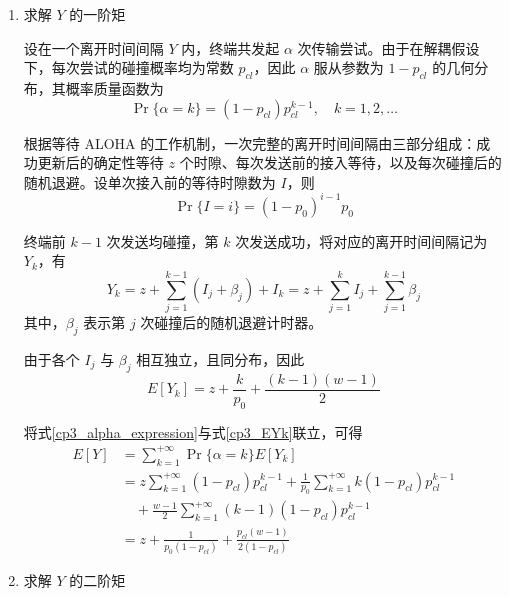 \begin{enumerate}[wide]
    \item 求解 $Y$ 的一阶矩

    设在一个离开时间间隔 $Y$ 内，终端共发起 $\alpha$ 次传输尝试。由于在解耦假设下，每次尝试的碰撞概率均为常数 $p_{cl}$，因此 $\alpha$ 服从参数为 $1-p_{cl}$ 的几何分布，其概率质量函数为
    \begin{equation}\label{cp3_alpha_expression}
        \Pr\{\alpha=k\}=(1-p_{cl})p_{cl}^{k-1},\quad k=1,2,\dots
    \end{equation}

    根据等待 ALOHA 的工作机制，一次完整的离开时间间隔由三部分组成：成功更新后的确定性等待 $z$ 个时隙、每次发送前的接入等待，以及每次碰撞后的随机退避。设单次接入前的等待时隙数为 $I$，则
    \begin{equation}\label{cp3_I_expression}
        \Pr\{I=i\}=(1-p_0)^{i-1}p_0
    \end{equation}

    终端前 $k-1$ 次发送均碰撞，第 $k$ 次发送成功，将对应的离开时间间隔记为 $Y_k$，有
    \begin{equation}\label{cp3_Yk_expression}
        Y_k=z+\sum_{j=1}^{k-1}(I_j+\beta_j)+I_k
        =z+\sum_{j=1}^{k}I_j+\sum_{j=1}^{k-1}\beta_j
    \end{equation}
    其中，$\beta_j$ 表示第 $j$ 次碰撞后的随机退避计时器。

    由于各个 $I_j$ 与 $\beta_j$ 相互独立，且同分布，因此
    \begin{equation}\label{cp3_EYk}
        E[Y_k]=z+\frac{k}{p_0}+\frac{(k-1)(w-1)}{2}
    \end{equation}

    将式\eqref{cp3_alpha_expression}与式\eqref{cp3_EYk}联立，可得
    \begin{equation}\label{cp3_EY}
        \begin{split}
            E[Y] &= \sum_{k=1}^{+\infty}\Pr\{\alpha=k\}E[Y_k] \\
            &= z\sum_{k=1}^{+\infty}(1-p_{cl})p_{cl}^{k-1} + \frac{1}{p_0}\sum_{k=1}^{+\infty}k(1-p_{cl})p_{cl}^{k-1} \\
            &\quad + \frac{w-1}{2}\sum_{k=1}^{+\infty}(k-1)(1-p_{cl})p_{cl}^{k-1} \\
            &= z + \frac{1}{p_0(1-p_{cl})} + \frac{p_{cl}(w-1)}{2(1-p_{cl})}
        \end{split}
    \end{equation}

    \item 求解 $Y$ 的二阶矩


\end{enumerate}
